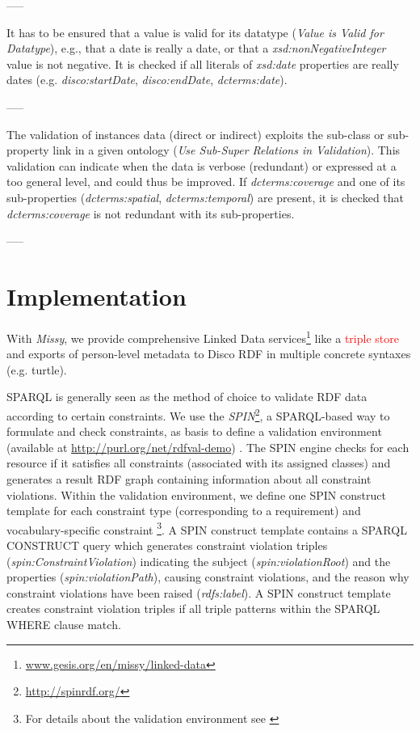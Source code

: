 \documentclass{llncs}
\begin{document}
{{-----

It has to be ensured that a value is valid for its datatype (\emph{Value is Valid for Datatype}), e.g., 
that a date is really a date, or that a \emph{xsd:nonNegativeInteger} value is not negative. 
It is checked if all literals of {\em xsd:date} properties are really dates (e.g. {\em disco:startDate}, {\em disco:endDate}, {\em dcterms:date}).

-----

The validation of instances data (direct or indirect) exploits the sub-class or sub-property link in a given ontology (\emph{Use Sub-Super Relations in Validation}).
This validation can indicate when the data is verbose (redundant) or expressed at a too general level, and could thus be improved.
If \emph{dcterms:coverage} and one of its sub-properties (\emph{dcterms:spatial}, \emph{dcterms:temporal}) are present,
it is checked that \emph{dcterms:coverage} is not redundant with its sub-properties. 

-----

\section{Implementation}

With \emph{Missy}, we provide comprehensive Linked Data services\footnote{\textcolor{red}{\url{www.gesis.org/en/missy/linked-data}}} like a \textcolor{red}{triple store} and exports of person-level metadata to Disco RDF in multiple concrete syntaxes (e.g. turtle). 

SPARQL is generally seen as the method of choice to validate RDF data according to certain constraints.
We use the \emph{SPIN}\footnote{\url{http://spinrdf.org/}}, 
a SPARQL-based way to formulate and check constraints, as basis to define a
validation environment (available at \url{http://purl.org/net/rdfval-demo}) \cite{BoschEckert2014-2}.
The SPIN engine checks for each resource if it satisfies all constraints (associated with its assigned classes) and generates a result RDF graph containing information about all constraint violations.
Within the validation environment, we define one SPIN construct template for each constraint type (corresponding to a requirement) and vocabulary-specific constraint \footnote{For details about the validation environment see \cite{BoschEckert2014-2}}.
A SPIN construct template contains a SPARQL CONSTRUCT query which generates constraint violation triples (\emph{spin:ConstraintViolation}) indicating the subject (\emph{spin:violationRoot}) and the properties (\emph{spin:violationPath}), causing constraint violations, and the reason why constraint violations have been raised (\emph{rdfs:label}).
A SPIN construct template creates constraint violation triples if all triple patterns within the SPARQL WHERE clause match.

}}
\end{document}
